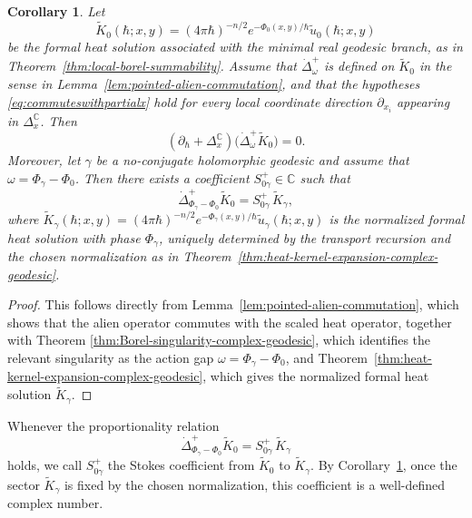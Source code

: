 \documentclass[11pt]{amsart}
\theoremstyle{plain}
\newtheorem{cor}[thm]{Corollary}
\theoremstyle{definition}
\newcommand{\C}{\mathbb{C}}
\begin{document}
\begin{cor}
\label{cor:alien-heat-solution-action-gap}
Let
\[
\widetilde K_0(\hbar;x,y)
=
(4\pi\hbar)^{-n/2}
e^{-\Phi_0(x,y)/\hbar}
\widetilde u_0(\hbar;x,y)
\]
be the formal heat solution associated with the minimal real geodesic branch,
as in Theorem~\ref{thm:local-borel-summability}. 
Assume that $\dot\Delta_\omega^+$ is defined on
$\widetilde K_0$ in the sense in Lemma~\ref{lem:pointed-alien-commutation}, and that the hypotheses \eqref{eq:commuteswithpartialx} hold for every local coordinate
direction $\partial_{x_i}$ appearing in $\Delta_x^{\C}$.  Then
\[
\left(\partial_\hbar+\Delta_x^{\C}\right)
\bigl(\dot\Delta_\omega^+\widetilde K_0\bigr)
=0.
\]
Moreover, let $\gamma$ be a no-conjugate holomorphic geodesic and assume that $\omega=\Phi_\gamma-\Phi_0 $. Then there exists a coefficient $S_{0\gamma}^+\in\C$ such that
\[
\dot\Delta_{\Phi_\gamma-\Phi_0}^{+}\widetilde K_0
=
S_{0\gamma}^+\,\widetilde K_\gamma ,
\]
where $\widetilde K_\gamma(\hbar;x,y)
=
(4\pi\hbar)^{-n/2}
e^{-\Phi_\gamma(x,y)/\hbar}
\widetilde u_\gamma(\hbar;x,y)$ is the normalized formal heat solution with phase $\Phi_\gamma$, uniquely
determined by the transport recursion and the chosen normalization as in Theorem~\ref{thm:heat-kernel-expansion-complex-geodesic}.
\end{cor}

\begin{proof}
This follows directly from Lemma~\ref{lem:pointed-alien-commutation}, which shows that the alien operator commutes with the scaled heat operator, together with Theorem \ref{thm:Borel-singularity-complex-geodesic}, which identifies the relevant singularity as the action gap $\omega=\Phi_\gamma-\Phi_0$, and Theorem~\ref{thm:heat-kernel-expansion-complex-geodesic}, which gives the normalized formal heat solution $\widetilde K_\gamma$.
\end{proof}



Whenever the proportionality relation
\[
\dot\Delta_{\Phi_\gamma-\Phi_0}^{+}\widetilde K_0
=
S_{0\gamma}^{+}\,\widetilde K_\gamma
\]
holds, we call $S_{0\gamma}^{+}$ the Stokes coefficient from $\widetilde K_0$ to 
$\widetilde K_\gamma$.  By
Corollary~\ref{cor:alien-heat-solution-action-gap}, once the sector
$\widetilde K_\gamma$ is fixed by the chosen normalization, this coefficient
is a well-defined complex number.
\end{document}
